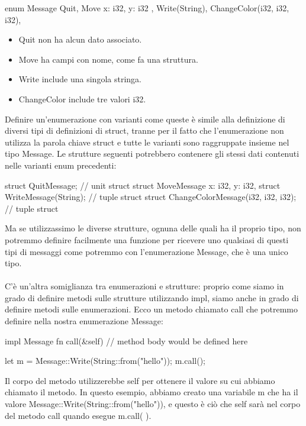 \documentclass[11pt,a4paper]{article}
\begin{document}
\begin{rust}
enum Message {
    Quit,
    Move { x: i32, y: i32 },
    Write(String),
    ChangeColor(i32, i32, i32),
}
\end{rust}


\begin{itemize}
\item Quit non ha alcun dato associato.
\item Move ha campi con nome, come fa una struttura.
\item Write include una singola stringa.
\item ChangeColor include tre valori i32.
\end{itemize}

Definire un'enumerazione con varianti come queste è simile alla definizione di diversi tipi di definizioni di struct, tranne per il fatto che l'enumerazione non utilizza la parola chiave struct e tutte le varianti sono raggruppate insieme nel tipo Message. Le strutture seguenti potrebbero contenere gli stessi dati contenuti nelle varianti enum precedenti:

\begin{rust}
struct QuitMessage; // unit struct
struct MoveMessage {
    x: i32,
    y: i32,
}
struct WriteMessage(String); // tuple struct
struct ChangeColorMessage(i32, i32, i32); // tuple struct

\end{rust}
Ma se utilizzassimo le diverse strutture, ognuna delle quali ha il proprio tipo, non potremmo definire facilmente una funzione per ricevere uno qualsiasi di questi tipi di messaggi come potremmo con l'enumerazione Message, che è una unico tipo.\\
\\
C'è un'altra somiglianza tra enumerazioni e strutture: proprio come siamo in grado di definire metodi sulle strutture utilizzando impl, siamo anche in grado di definire metodi sulle enumerazioni. Ecco un metodo chiamato call che potremmo definire nella nostra enumerazione Message:
\begin{rust}
    impl Message {
        fn call(&self) {
            // method body would be defined here
        }
    }

    let m = Message::Write(String::from("hello"));
    m.call();
\end{rust}
Il corpo del metodo utilizzerebbe self per ottenere il valore su cui abbiamo chiamato il metodo. In questo esempio, abbiamo creato una variabile m che ha il valore Message::Write(String::from("hello")), e questo è ciò che self sarà nel corpo del metodo call quando esegue m.call( ).
\end{document}
